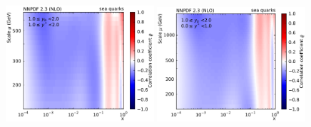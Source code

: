 \begin{figure}[htbp]
    \includegraphics[width=0.49\textwidth]{figures/pdf_constraints/corr_PTMAXEXPYS_YBYS_NLO_FINALBINS_NNPDF23_sea_quarks_ys1_0yb1_0_cl.pdf}\hfill
    \includegraphics[width=0.49\textwidth]{figures/pdf_constraints/corr_PTMAXEXPYS_YBYS_NLO_FINALBINS_NNPDF23_sea_quarks_ys0_0yb0_0_cl.pdf}\hfill
    \caption{}
    \label{fig:pdfconstraints_gluon}
\end{figure}

